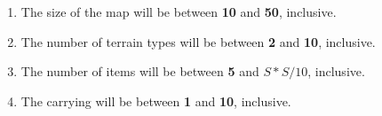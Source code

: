 \documentclass[hyperref,UTF8]{ctexart}
\theoremstyle{definition}
\theoremstyle{remark}
\numberwithin{equation}{subsection}
\newcommand{\Emph}{\textbf}
\begin{document}
	\begin{enumerate}[(1)]
	
		\item The size of the map  will be between \Emph{10} and \Emph{50}, inclusive.
		
		\item The number of terrain types  will be between \Emph{2} and \Emph{10}, inclusive.
		
		\item The number of items  will be between \Emph{5} and $S \ast S / 10$, inclusive.
		
		\item The carrying  will be between \Emph{1} and \Emph{10}, inclusive.
		
	\end{enumerate}
	
\end{document}
